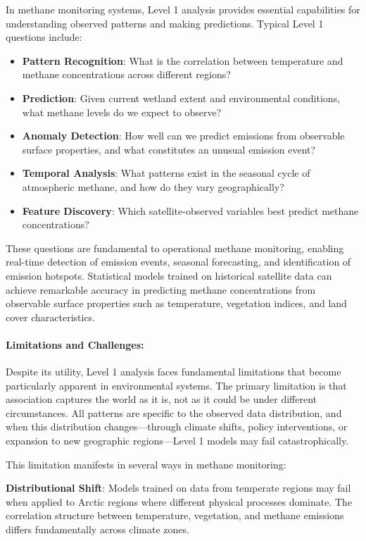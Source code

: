 In methane monitoring systems, Level 1 analysis provides essential capabilities for understanding observed patterns and making predictions. Typical Level 1 questions include:

\begin{itemize}
	\item \textbf{Pattern Recognition}: What is the correlation between temperature and methane concentrations across different regions?
	\item \textbf{Prediction}: Given current wetland extent and environmental conditions, what methane levels do we expect to observe?
	\item \textbf{Anomaly Detection}: How well can we predict emissions from observable surface properties, and what constitutes an unusual emission event?
	\item \textbf{Temporal Analysis}: What patterns exist in the seasonal cycle of atmospheric methane, and how do they vary geographically?
	\item \textbf{Feature Discovery}: Which satellite-observed variables best predict methane concentrations?
\end{itemize}

These questions are fundamental to operational methane monitoring, enabling real-time detection of emission events, seasonal forecasting, and identification of emission hotspots. Statistical models trained on historical satellite data can achieve remarkable accuracy in predicting methane concentrations from observable surface properties such as temperature, vegetation indices, and land cover characteristics.

\paragraph{Limitations and Challenges:}

Despite its utility, Level 1 analysis faces fundamental limitations that become particularly apparent in environmental systems. The primary limitation is that association captures the world as it is, not as it could be under different circumstances. All patterns are specific to the observed data distribution, and when this distribution changes—through climate shifts, policy interventions, or expansion to new geographic regions—Level 1 models may fail catastrophically.

This limitation manifests in several ways in methane monitoring:

\textbf{Distributional Shift}: Models trained on data from temperate regions may fail when applied to Arctic regions where different physical processes dominate. The correlation structure between temperature, vegetation, and methane emissions differs fundamentally across climate zones.

